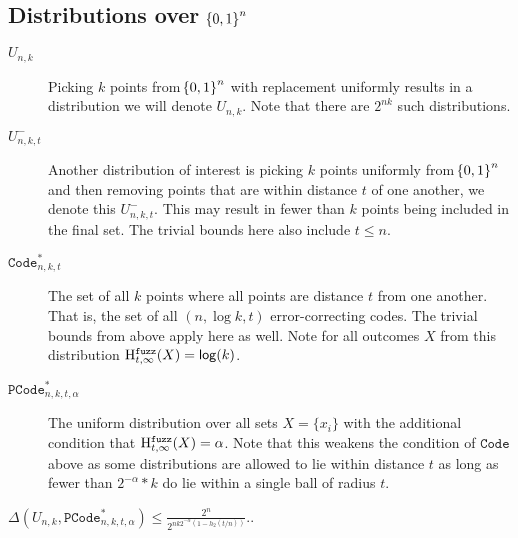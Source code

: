 \subsection{Distributions over $\!\left\{ 0,1 \right\}^{n}$}
\begin{description}
    \item[$U_{n,k}$] Picking $k$ points from $\!\left\{ 0,1 \right\}^{n}$ with replacement uniformly results in a distribution we will denote $U_{n,k}$. Note that there are $2^{nk}$ such distributions.

    \item[$U_{n,k,t}^{-}$] Another distribution of interest is picking $k$ points uniformly from $\!\left\{ 0,1 \right\}^{n}$ and then removing points that are within distance $t$ of one another, we denote this $U_{n,k,t}^{-}$. 
    This may result in fewer than $k$ points being included in the final set. 
    The trivial bounds here also include $t \leq n$. 

    \item[$\mathtt{Code}_{n,k,t}^{*}$] The set of all $k$ points where all points are distance $t$ from one another.  That is, the set of all $(n,\log k, t)$ error-correcting codes. The trivial bounds from above apply here as well.  Note for all outcomes $X$ from this distribution $\mathrm{H}^{\mathtt{fuzz}}_{t,\infty}(X) = \mathsf{log}\!\left(k\right)$.
    
    \item[$\mathtt{PCode}_{n, k, t, \alpha}^{*}$] The uniform distribution over all sets $X = \{x_i\}$ with the additional condition that $\mathrm{H}^{\mathtt{fuzz}}_{t,\infty}(X) = \alpha$.  Note that this weakens the condition of $\mathtt{Code}$ above as some distributions are allowed to lie within distance $t$ as long as fewer than $2^{-\alpha}*k$ do lie within a single ball of radius $t$.
\end{description}
 
 
 \begin{lemma}
 $\Delta(U_{n,k}, \mathtt{PCode}_{n, k, t, \alpha}^{*}) \le \frac{2^n}{2^{nk2^{-\alpha}(1-h_2(t/n))}}.$.
 \end{lemma}
 
